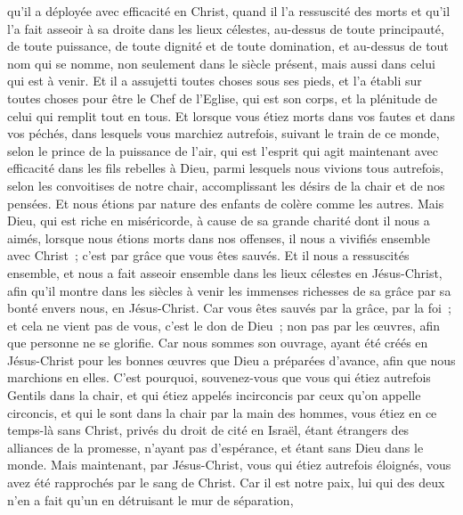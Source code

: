 \begin{multicols}{2}
qu'il a déployée avec efficacité en Christ, quand il l'a ressuscité des morts et qu'il l'a fait asseoir à sa droite dans les lieux célestes,
au-dessus de toute principauté, de toute puissance, de toute dignité et de toute domination, et au-dessus de tout nom qui se nomme, non seulement dans le siècle présent, mais aussi dans celui qui est à venir.
Et il a assujetti toutes choses sous ses pieds, et l'a établi sur toutes choses pour être le Chef de l'Eglise,
qui est son corps, et la plénitude de celui qui remplit tout en tous.
\VerseOne{}Et lorsque vous étiez morts dans vos fautes et dans vos péchés,
dans lesquels vous marchiez autrefois, suivant le train de ce monde, selon le prince de la puissance de l'air, qui est l'esprit qui agit maintenant avec efficacité dans les fils rebelles à Dieu,
parmi lesquels nous vivions tous autrefois, selon les convoitises de notre chair, accomplissant les désirs de la chair et de nos pensées. Et nous étions par nature des enfants de colère comme les autres.
Mais Dieu, qui est riche en miséricorde, à cause de sa grande charité dont il nous a aimés,
lorsque nous étions morts dans nos offenses, il nous a vivifiés ensemble avec Christ~; c'est par grâce que vous êtes sauvés.
Et il nous a ressuscités ensemble, et nous a fait asseoir ensemble dans les lieux célestes en Jésus-Christ,
afin qu'il montre dans les siècles à venir les immenses richesses de sa grâce par sa bonté envers nous, en Jésus-Christ.
Car vous êtes sauvés par la grâce, par la foi~; et cela ne vient pas de vous, c'est le don de Dieu~;
non pas par les œuvres, afin que personne ne se glorifie.
Car nous sommes son ouvrage, ayant été créés en Jésus-Christ pour les bonnes œuvres que Dieu a préparées d'avance, afin que nous marchions en elles.
C'est pourquoi, souvenez-vous que vous qui étiez autrefois Gentils dans la chair, et qui étiez appelés incirconcis par ceux qu'on appelle circoncis, et qui le sont dans la chair par la main des hommes,
vous étiez en ce temps-là sans Christ, privés du droit de cité en Israël, étant étrangers des alliances de la promesse, n'ayant pas d'espérance, et étant sans Dieu dans le monde.
Mais maintenant, par Jésus-Christ, vous qui étiez autrefois éloignés, vous avez été rapprochés par le sang de Christ.
Car il est notre paix, lui qui des deux n'en a fait qu'un en détruisant le mur de séparation,

\end{multicols}
